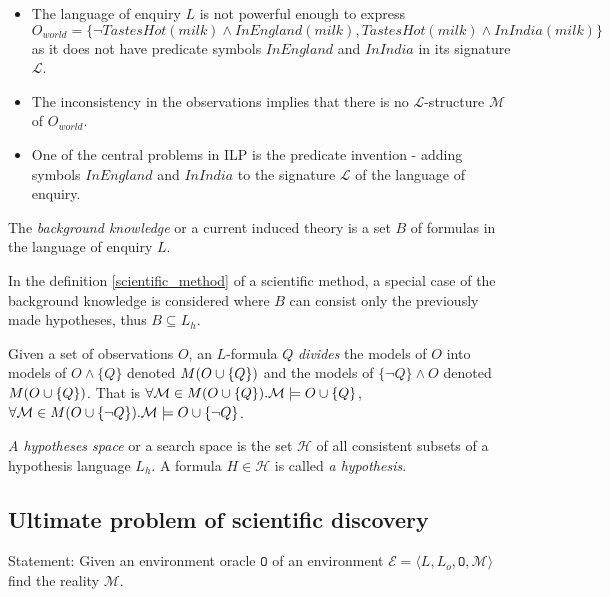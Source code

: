 \begin{remark}
\begin{itemize}
\item The language of enquiry $L$ is not powerful enough to express $O_{world}=\{\neg TastesHot(milk) \land InEngland(milk), TastesHot(milk) \land InIndia(milk)\}$
 as it does not have predicate symbols $InEngland$ and $InIndia$ in its signature $\mathcal{L}$.
\item The inconsistency in the observations implies that there is no $\mathcal{L}$-structure $\mathcal{M}$ of $O_{world}$.
\item One of the central problems in ILP is the predicate invention - adding symbols $InEngland$ and $InIndia$ to the signature $\mathcal{L}$ of the language of enquiry.
\end{itemize}
\end{remark}

\begin{defn}
The \emph{background knowledge} or a current induced theory is a set $B$ of formulas in the language of enquiry $L$.
\end{defn}

\begin{remark}
In the definition \ref{scientific_method} of a scientific method, a special case of the background knowledge is considered where $B$ can consist only the previously made hypotheses, thus $B \subseteq L_h$.
\end{remark}

\begin{note}
Given a set of observations $O$, an $L$-formula $Q$ \emph{divides} the models of $O$ into models of $O \wedge \{Q\}$ denoted $M(O \cup \{Q\})$ and the models of $\{\neg Q\} \wedge O$ denoted $M(O \cup \{Q\})$. That is $\forall \mathcal{M} \in M(O \cup \{Q\}). \mathcal{M} \models O \cup \{Q\}$,
$\forall \mathcal{M} \in M(O \cup \{\neg Q\}). \mathcal{M} \models O \cup \{\neg Q\}$.
\end{note}

\begin{defn}
\emph{A hypotheses space} or a search space is the set $\mathcal{H}$ of all consistent subsets of a hypothesis language $L_h$. A formula $H \in \mathcal{H}$ is called \emph{a hypothesis}.
\end{defn}

\subsection{Ultimate problem of scientific discovery}
Statement: Given an environment oracle $\mathtt{O}$ of an environment $\mathcal{E}=\langle L, L_o, \mathtt{O}, \mathcal{M} \rangle$ find the reality $\mathcal{M}$.

